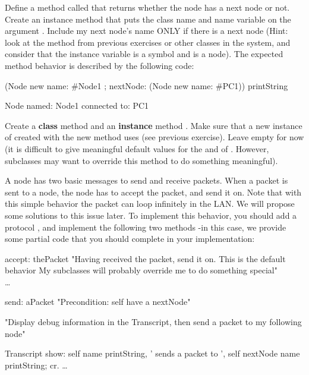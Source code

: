 \exercise  Define a method called  that
returns whether the node has a next node or not. \\

\exercise  Create an instance method  that puts
the class name and name variable on the argument
. Include my next node's name ONLY if there is a
next node (Hint: look at the method  from
previous exercises or other classes in the system, and consider that the instance variable
 is a symbol and  is a node). The expected  method behavior is described by the following code:

\begin{code}
(Node new
   name: \#Node1 ;
   nextNode: (Node new name: \#PC1)) printString

Node named: Node1 connected to: PC1
\end{code}

\exercise  Create a \textbf{class} method  and an
\textbf{instance} method . Make sure that a new
instance of  created with the new method uses
 (see previous exercise). Leave
 empty for now (it is difficult to give meaningful
default values for the  and  of
. However, subclasses may want to override this
method to do something meaningful).

\exercise  A node has two basic messages to send and receive
packets. When a packet is sent to a node, the node has to accept
the packet, and send it on. Note that with this simple behavior
the packet can loop infinitely in the LAN. We will propose some
solutions to this issue later. To
implement this behavior, you should add a protocol
, and implement the following two methods -in
this case, we provide some partial code that you should complete
in your implementation:

\begin{code}
accept: thePacket
 "Having received the packet, send it on. This is the default
behavior My subclasses will probably override me to do
something special"\\
    \dots

send: aPacket
"Precondition: self have a nextNode"

"Display debug information in the Transcript, then
send a packet to my following node"

 Transcript show:
   self name printString,
      ' sends a packet to ',
      self nextNode name printString; cr.
\dots
\end{code}

